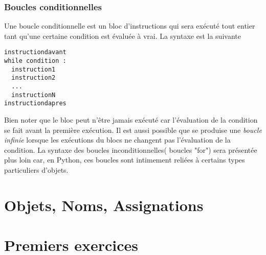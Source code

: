 \subsubsection{Boucles conditionnelles}
Une boucle conditionnelle est un bloc d'instructions qui sera exécuté tout entier tant qu'une certaine condition est évaluée à vrai. La syntaxe est la suivante
\begin{verbatim}
instructiondavant
while condition :
  instruction1
  instruction2
  ...
  instructionN
instructiondapres
\end{verbatim}
Bien noter que le bloc peut n'être jamais exécuté car l'évaluation de la condition se fait avant la première exécution. Il est aussi possible que se produise une \emph{boucle infinie} lorsque les exécutions du blocs ne changent pas l'évaluation de la condition.\newline
La syntaxe des boucles inconditionnelles( boucles "for") sera présentée plus loin car, en Python, ces boucles sont intimement reliées à certains types particuliers d'objets.

\section{Objets, Noms, Assignations}


\section{Premiers exercices}


\printindex
